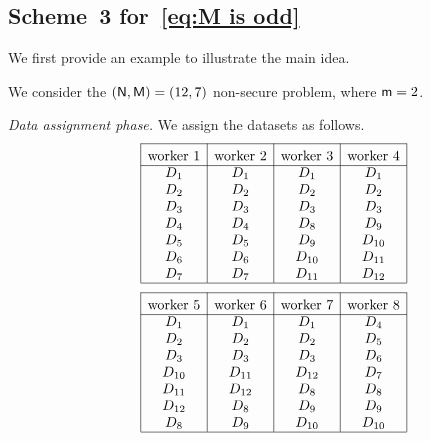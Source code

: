 \documentclass[conference,letterpaper]{IEEEtran}
\begin{document}
\subsection{\texorpdfstring{Scheme~3 for~\eqref{eq:M is odd}}{Scheme 3 for Eq. (Y)}}
\label{sub:M is odd}
We first provide an example to illustrate the main idea.
\begin{example}
\label{ex:scheme 3 example}
We consider the $({\sf N}, {\sf M}) = (12, 7)$ non-secure problem, where ${\sf m} = 2$.

{\it Data assignment phase.}
We assign the datasets as follows.  
\begin{align*}
\begin{array}{rl|c|c|c|c|}\cline{3-3}\cline{4-4}\cline{5-5}\cline{6-6}
&&\rule{0pt}{1.2em}\mbox{worker 1}  &\rule{0pt}{1.2em}\mbox{worker 2}  & \rule{0pt}{1.2em}\mbox{worker 3} & \rule{0pt}{1.2em}\mbox{worker 4}  \\ \cline{3-3}\cline{4-4}\cline{5-5}\cline{6-6}
&& D_1 & D_1 & D_1 & D_1 \\
&& D_2 & D_2 & D_2 & D_2  \\
&& D_3 & D_3 & D_3 & D_3 \\
&& D_4 & D_4 & D_8 & D_9  \\
&& D_5 & D_5 & D_9 & D_{10} \\
&& D_6 & D_6 & D_{10} & D_{11} \\
&& D_7 & D_7 & D_{11} & D_{12} \\
\cline{3-3}\cline{4-4}\cline{5-5}\cline{6-6}
\end{array}
\end{align*}
\begin{align*}
\begin{array}{rl|c|c|c|c|}\cline{3-3}\cline{4-4}\cline{5-5}\cline{6-6}
&&\rule{0pt}{1.2em}\mbox{worker 5} & \rule{0pt}{1.2em}\mbox{worker 6}  & \rule{0pt}{1.2em}\mbox{worker 7} & \rule{0pt}{1.2em}\mbox{worker 8} \\ \cline{3-3}\cline{4-4}\cline{5-5}\cline{6-6}
&& D_1 & D_1 & D_1 & D_4\\
&& D_2 & D_2 & D_2 & D_5\\
&& D_3 & D_3 & D_3 & D_6\\
&& D_{10} & D_{11} & D_{12} & D_7\\
&& D_{11} & D_{12} & D_8 & D_8\\
&& D_{12} & D_8 & D_9 & D_9\\
&& D_8 & D_9 & D_{10} & D_{10}\\
\cline{3-3}\cline{4-4}\cline{5-5}\cline{6-6}
\end{array}

\end{align*}
\end{example}
\end{document}
